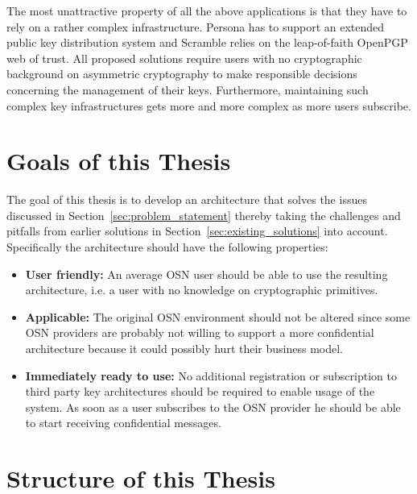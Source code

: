 The most unattractive property of all the above applications is that they have to rely on a rather complex infrastructure. Persona has to support an extended public key distribution system and Scramble relies on the leap-of-faith OpenPGP web of trust. All proposed solutions require users with no cryptographic background on asymmetric cryptography to make responsible decisions concerning the management of their keys. Furthermore, maintaining such complex key infrastructures gets more and more complex as more users subscribe.

\section{Goals of this Thesis}
\label{sec:goals_of_this_thesis}
The goal of this thesis is to develop an architecture that solves the issues discussed in Section~\ref{sec:problem_statement} thereby taking the challenges and pitfalls from earlier solutions in Section~\ref{sec:existing_solutions} into account. Specifically the architecture should have the following properties:
\begin{itemize}
 \item \textbf{User friendly:} An average OSN user should be able to use the resulting architecture, i.e. a user with no knowledge on cryptographic primitives.
 \item \textbf{Applicable:} The original OSN environment should not be altered since some OSN providers are probably not willing to support a more confidential architecture because it could possibly hurt their business model.
 \item \textbf{Immediately ready to use:} No additional registration or subscription to third party key architectures should be required to enable usage of the system. As soon as a user subscribes to the OSN provider he should be able to start receiving confidential messages.
\end{itemize}


\section{Structure of this Thesis}

